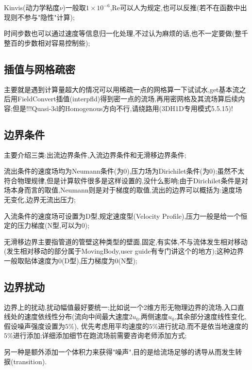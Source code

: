 Kinvis(动力学粘度$\nu$)一般取$1\times 10^{-6}$,Re可以人为规定,也可以反推(若不在函数中出现则不参与"隐性"计算);

时间步数也可以通过速度等信息归一化处理,不过认为麻烦的话,也不一定要做(整千整百的步数相对容易控制些);

\subsection{插值与网格疏密}

主要就是遇到计算量超大的情况可以用稀疏一点的网格算一下试试水,get基本流之后用FieldConvert插值(interpfld)得到密一点的流场,再用密网格及其流场算后续内容;但是!!!Quasi-3d的Homogenous方向不行,请绕路用(3DH1D专用模式5.5.15)!



\subsection{边界条件} \label{BoundaryOther}
主要介绍三类:出流边界条件,入流边界条件和无滑移边界条件;\par
流出条件的速度场均为Neumann条件(为0),压力场为Dirichilet条件(为0);虽然不太符合物理规律,但是计算软件很多是这样设置的,没什么影响;由于Dirichilet条件是对场本身而言的取值,Neumann则是对于梯度的取值,流出的边界可以概括为:速度场无变化,边界无流出压力;\par
入流条件的速度场可设置为D型,规定速度型(Velocity Profile),压力一般是给一个恒定的压力梯度(N型,可以为0);\par
无滑移边界主要指管道的管壁这种类型的壁面,固定,有实体,不与流体发生相对移动(发生相对移动的部分属于MovingBody,user guide有专门讲这个的地方);这种边界一般取贴体速度为0(D型),压力梯度为0(N型);

\subsection{边界扰动}

边界上的扰动,扰动幅值最好要统一;比如说一个2维方形无物理边界的流场,入口直线处的速度依线性分布(流向中间最大速度2$u_0$,两侧速度$u_0$,其余部分速度线性变化,假设噪声强度设置为$5\%$), 优先考虑用平均速度的$5\%$进行扰动,而不是依当地速度的$5\%$进行添加;详细添加细节在跑流场前需要咨询老师添加方式;\par
另一种是额外添加一个体积力来获得"噪声",目的是给流场足够的诱导从而发生转捩(transition).



